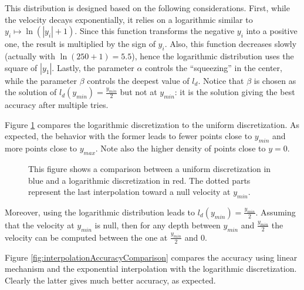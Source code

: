 \documentclass[final]{jcgt}
\begin{document}
This distribution is designed based on the following considerations.
First, while the velocity decays exponentially, it relies on a logarithmic similar to $y_i\mapsto \ln(|y_i|+1)$.
Since this function transforms the negative $y_i$ into a positive one, the result is multiplied by the sign of $y_i$.
Also, this function decreases slowly (actually with $\ln(250+1)=5.5$), hence the logarithmic distribution uses the square of $|y_1|$.
Lastly, the parameter $\alpha$ controls the “squeezing” in the center, while the parameter $\beta$ controls the deepest value of $l_d$.
Notice that $\beta$ is chosen as the solution of $l_d(y_{min})=\frac{y_{min}}{2}$ but not at $y_{min}$: it is the solution giving the best accuracy after multiple tries.

Figure \ref{fig:comparisonGrid} compares the logarithmic discretization to the uniform discretization. As expected, the behavior with the former leads to fewer points close to $y_{min}$ and more points close to $y_{max}$.
Note also the higher density of points close to $y=0$.

\begin{figure}[ht]
	\centering
	\hfill
	\caption{This figure shows a comparison between a \textcolor{bleuF}{uniform discretization in blue} and a \textcolor{redF}{logarithmic discretization in red}. The dotted parts represent the last interpolation toward a null velocity at $y_{min}$.}
	\label{fig:comparisonGrid}
\end{figure}

Moreover, using the logarithmic distribution leads to $l_d(y_{min})=\frac{y_{min}}{2}$.
Assuming that the velocity at $y_{min}$ is null, then for any depth between $y_{min}$ and $\frac{y_{min}}{2}$ the velocity can be computed between the one at $\frac{y_{min}}{2}$ and $0$.

Figure \ref{fig:interpolationAccuracyComparison} compares the accuracy using linear mechanism and the exponential interpolation with the logarithmic discretization.
Clearly the latter gives much better accuracy, as expected.
\end{document}
